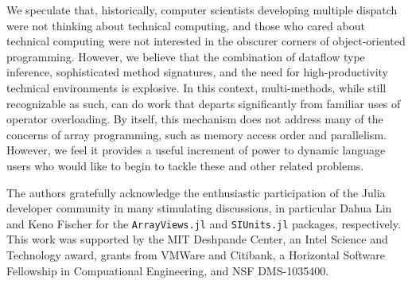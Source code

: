 \documentclass{sigplanconf}
\newcommand{\code}[1]{\texttt{#1}}
\begin{document}
We speculate that, historically, computer scientists developing multiple 
dispatch were not thinking about technical computing, and those who cared
about technical computing were not interested in the obscurer corners of
object-oriented programming. However, we believe that the combination of
dataflow type inference, sophisticated method signatures, and the need for
high-productivity technical environments is explosive. In this context,
multi-methods, while still recognizable as such, can do work that departs
significantly from familiar uses of operator overloading. By itself, this
mechanism does not address many of the concerns of array programming, such
as memory access order and parallelism. However, we feel it provides a
useful increment of power to dynamic language users who would like to begin
to tackle these and other related problems.


%

\acks

The authors gratefully acknowledge the enthusiastic participation of the Julia
developer community in many stimulating discussions, in particular Dahua Lin and
Keno Fischer for the \code{ArrayViews.jl}\cite{Lin:2014av} and
\code{SIUnits.jl}\cite{Fischer:2014si} packages, respectively. This
work was supported by the MIT Deshpande Center, an Intel Science and
Technology award, grants from VMWare and Citibank, a Horizontal Software
Fellowship in Compuational Engineering, and NSF DMS-1035400.


{}





\end{document}
